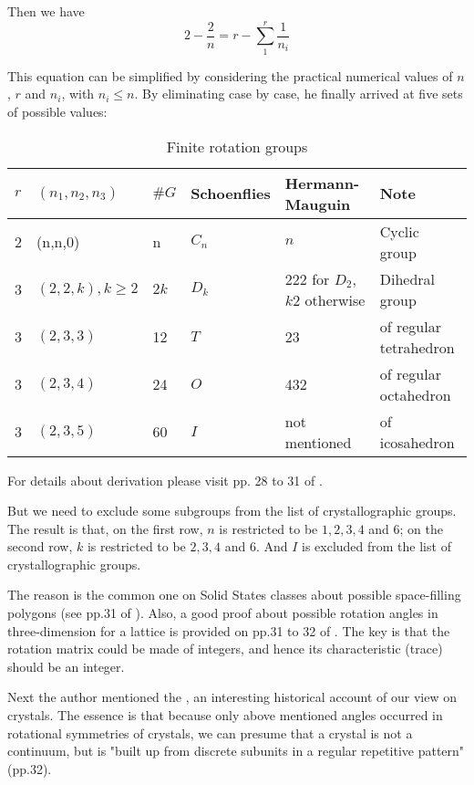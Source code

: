 \documentclass{article}
\begin{document}
Then we have
\begin{equation}
    2-\frac{2}{n} = r-\sum_{1}^{r} \frac{1}{n_i}
\end{equation}

This equation can be simplified by considering the practical numerical values of
$n$, $r$ and $n_i$, with $n_i \leq n$. By eliminating case by case, he finally arrived
at five sets of possible values:
\begin{table}[H]
\centering
\label{tab:label}
\caption{Finite rotation groups}
\begin{tabular}{l l l l l l}
    \hline
    $r$ & $(n_1,n_2,n_3)$ & $\# G$ & Schoenflies & Hermann-Mauguin & Note
    \\
    \hline
    \hline
    2 & (n,n,0) & n & $C_n$ & $n$ & Cyclic group \\
    3 & $(2,2,k), k\geq 2$ & $2k$ & $D_k$ & $222$ for $D_2$, $k2$ otherwise & Dihedral group \\
    3 & $(2,3,3)$ & 12  & $T$  & 23& of regular tetrahedron \\
    3 & $(2,3,4)$ & 24 & $O$ & 432 & of regular octahedron \\
    3 & $(2,3,5)$ & 60 & $I$ & not mentioned & of icosahedron \\
    \hline
\end{tabular}
\end{table}
For details about derivation please visit pp. 28 to 31 of \cite{Sternberg1994}.

But we need to exclude some subgroups from the list of crystallographic groups.
The result is that, on the first row, $n$ is restricted to be $1,2,3,4$ and $6$;
on the second row, $k$ is restricted to be $2,3,4$ and $6$. And $I$ is excluded
from the list of crystallographic groups. 

The reason is the common one on Solid States classes about possible space-filling
polygons (see pp.31 of \cite{Sternberg1994}). Also, a good proof about possible
rotation angles in three-dimension for a lattice is provided on pp.31 to 32 of
\cite{Sternberg1994}. The key is that the rotation matrix could be
made of integers, and hence its characteristic (trace) should be an integer.

Next the author mentioned the , an interesting
historical account of our view on crystals. The essence is that because only
above mentioned angles occurred in rotational symmetries of crystals, we can
presume that a crystal is not a continuum, but is "built up from discrete
subunits in a regular repetitive pattern" (pp.32).
\end{document}
